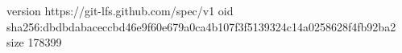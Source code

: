version https://git-lfs.github.com/spec/v1
oid sha256:dbdbdabaceccbd46e9f60e679a0ca4b107f3f5139324c14a0258628f4fb92ba2
size 178399
